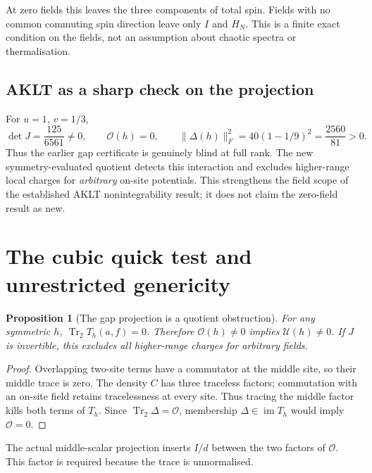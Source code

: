 \documentclass[11pt,a4paper]{article}
\numberwithin{equation}{section}
\newtheorem{proposition}[theorem]{Proposition}
\theoremstyle{definition}\newtheorem{definition}[theorem]{Definition}
\theoremstyle{remark}\newtheorem{remark}[theorem]{Remark}
\DeclareMathOperator{\Tr}{Tr}\DeclareMathOperator{\rank}{rank}
\DeclareMathOperator{\im}{im}\DeclareMathOperator{\ad}{ad}
\newcommand{\Ob}{\mathcal O}\newcommand{\tens}{\otimes}
\begin{document}
At zero fields this leaves the three components of total spin. Fields with no common commuting spin direction leave only $I$ and $H_N$. This is a finite exact condition on the fields, not an assumption about chaotic spectra or thermalisation.

\subsection{AKLT as a sharp check on the projection}
For $u=1$, $v=1/3$,
\[
 \det J=\frac{125}{6561}\ne0,\qquad
 \Ob(h)=0,\qquad
 \|\Delta(h)\|_F^2=40(1-1/9)^2=\frac{2560}{81}>0.
\]
Thus the earlier gap certificate is genuinely blind at full rank. The new symmetry-evaluated quotient detects this interaction and excludes higher-range local charges for \emph{arbitrary} on-site potentials. This strengthens the field scope of the established AKLT nonintegrability result; it does not claim the zero-field result as new.

\section{The cubic quick test and unrestricted genericity}\label{sec:quick}

\begin{proposition}[The gap projection is a quotient obstruction]\label{prop:gap}
For any symmetric $h$, $\Tr_2T_h(a,f)=0$. Therefore $\Ob(h)\ne0$ implies $\mathcal U(h)\ne0$. If $J$ is invertible, this excludes all higher-range charges for arbitrary fields.
\end{proposition}
\begin{proof}
Overlapping two-site terms have a commutator at the middle site, so their middle trace is zero. The density $C$ has three traceless factors; commutation with an on-site field retains tracelessness at every site. Thus tracing the middle factor kills both terms of $T_h$. Since $\Tr_2\Delta=\Ob$, membership $\Delta\in\im T_h$ would imply $\Ob=0$.
\end{proof}

The actual middle-scalar projection inserts $I/d$ between the two factors of $\Ob$. This factor is required because the trace is unnormalised.
\end{document}
